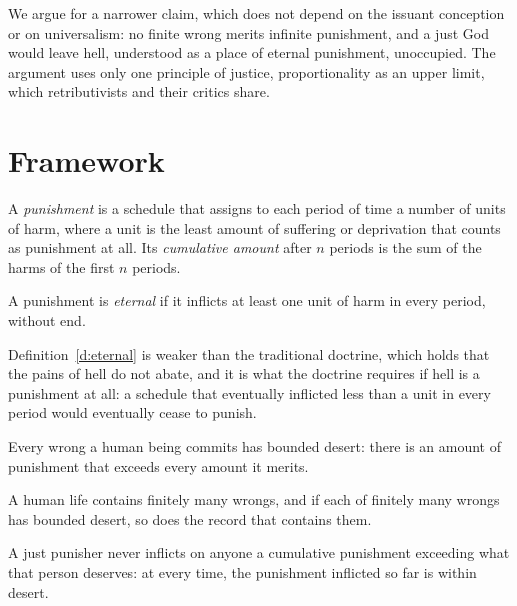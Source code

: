 \documentclass{situationist-preprint}
\begin{document}
We argue for a narrower claim, which does not depend on the issuant conception or on universalism: no finite wrong merits infinite punishment, and a just God would leave hell, understood as a place of eternal punishment, unoccupied. The argument uses only one principle of justice, proportionality as an upper limit, which retributivists and their critics share.

\section{Framework}

\begin{definition}[Punishment]\label{d:sched}
A \emph{punishment} is a schedule that assigns to each period of time a number of units of harm, where a unit is the least amount of suffering or deprivation that counts as punishment at all. Its \emph{cumulative amount} after $n$ periods is the sum of the harms of the first $n$ periods.
\end{definition}

\begin{definition}\label{d:eternal}
A punishment is \emph{eternal} if it inflicts at least one unit of harm in every period, without end.
\end{definition}

Definition~\ref{d:eternal} is weaker than the traditional doctrine, which holds that the pains of hell do not abate, and it is what the doctrine requires if hell is a punishment at all: a schedule that eventually inflicted less than a unit in every period would eventually cease to punish.

\begin{assumption}\label{a:finite}
Every wrong a human being commits has bounded desert: there is an amount of punishment that exceeds every amount it merits.
\end{assumption}

\begin{assumption}\label{a:record}
A human life contains finitely many wrongs, and if each of finitely many wrongs has bounded desert, so does the record that contains them.
\end{assumption}

\begin{principle}[Proportionality]\label{p:prop}
A just punisher never inflicts on anyone a cumulative punishment exceeding what that person deserves: at every time, the punishment inflicted so far is within desert.
\end{principle}
\end{document}

